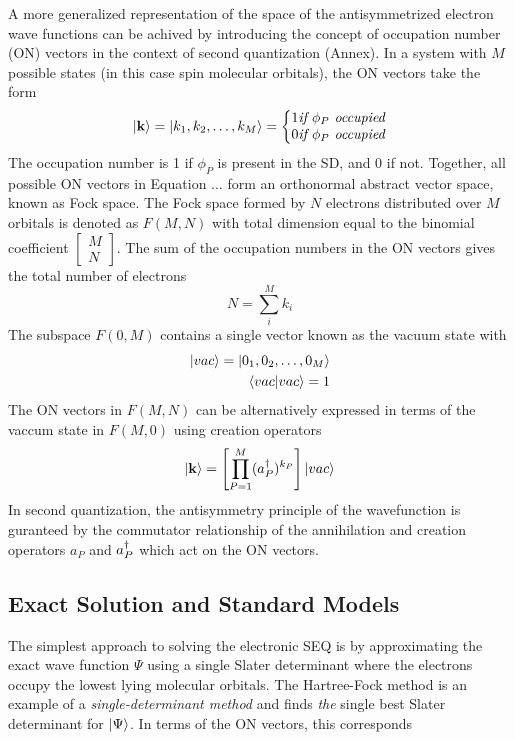 A more generalized representation of the space of the antisymmetrized electron wave functions can be achived by introducing the concept of occupation number (ON) vectors in the context of second quantization (Annex). In a system with $M$ possible states (in this case spin molecular orbitals), the ON vectors take the form
\begin{equation}
\ket{\mathbf{k}} = \ket{k_1, k_2, \ldots, k_M} = 
\left\lbrace
\begin{matrix}
1 \textit{if $\phi_P$ occupied} \\
0  \textit{if $\phi_P$ occupied}
\end{matrix}
\right.
\end{equation}
\noindent The occupation number is 1 if $\phi_P$ is present in the SD, and 0 if not. Together, all possible ON vectors in Equation ... form an orthonormal abstract vector space, known as Fock space. The Fock space formed by $N$ electrons distributed over $M$ orbitals is denoted as $F(M,N)$ with total dimension equal to the binomial coefficient $\begin{bmatrix} M \\ N \end{bmatrix}$. The sum of the occupation numbers in the ON vectors gives the total number of electrons
\begin{equation}
N = \sum_i^M k_i
\end{equation}
\noindent The subspace $F(0,M)$ contains a single vector known as the vacuum state with
\begin{align}
\ket{vac} = \ket{0_1, 0_2, \ldots, 0_M} \\
\bra{vac}\ket{vac} = 1
\end{align}
\noindent The ON vectors in $F(M,N)$ can be alternatively expressed in terms of the vaccum state in $F(M,0)$ using creation operators
\begin{equation}
\ket{\mathbf{k}} = \left[ \prod_{P=1}^M (a^{\dagger}_P)^{k_P} \right] \ket{vac}
\end{equation}
\noindent In second quantization, the antisymmetry principle of the wavefunction is guranteed by the commutator relationship of the annihilation and creation operators $a_P$ and $a^{\dagger}_P$ which act on the ON vectors.

\subsection{Exact Solution and Standard Models}

The simplest approach to solving the electronic SEQ is by approximating the exact wave function $\Psi$ using a single Slater determinant where the electrons occupy the lowest lying molecular orbitals. The Hartree-Fock method is an example of a \emph{single-determinant method} and finds \emph{the} single best Slater determinant for $\ket{\Psi}$. In terms of the ON vectors, this corresponds

